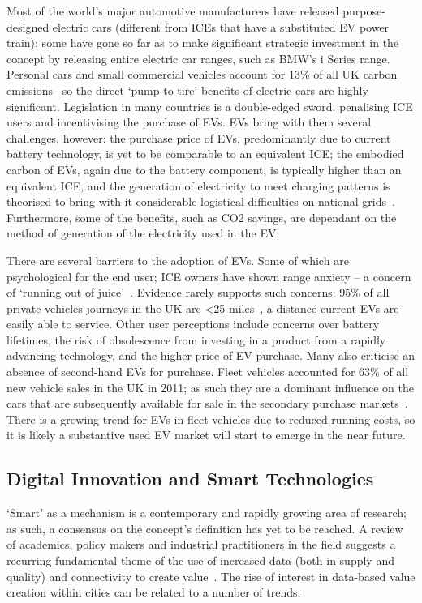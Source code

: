 \documentclass[journal]{IEEEtran}
\begin{document}
Most of the world's major automotive manufacturers have released
purpose-designed electric cars (different from ICEs that have a
substituted EV power train); some have gone so far as to make
significant strategic investment in the concept by releasing entire
electric car ranges, such as BMW's i Series range. Personal cars and
small commercial vehicles account for 13\% of all UK carbon
emissions~\cite{lumsden:2012} so the direct `pump-to-tire' benefits of
electric cars are highly significant. Legislation in many countries is
a double-edged sword: penalising ICE users and incentivising the
purchase of EVs. EVs bring with them several challenges, however: the
purchase price of EVs, predominantly due to current battery
technology, is yet to be comparable to an equivalent ICE; the embodied
carbon of EVs, again due to the battery component, is typically higher
than an equivalent ICE, and the generation of electricity to meet
charging patterns is theorised to bring with it considerable
logistical difficulties on national
grids~\cite{su-et-al:2011,akhavan-rezai-et-al:2015}. Furthermore, some
of the benefits, such as CO2 savings, are dependant on the method of
generation of the electricity used in the EV.

There are several barriers to the adoption of EVs. Some of which are
psychological for the end user; ICE owners have shown range anxiety --
a concern of `running out of
juice'~\cite{oflev:2011,yilmaz+krein:2012}. Evidence rarely supports
such concerns: 95\% of all private vehicles journeys in the UK are <25
miles~\cite{oflev:2011}, a distance current EVs are easily able to
service. Other user perceptions include concerns over battery
lifetimes, the risk of obsolescence from investing in a product from a
rapidly advancing technology, and the higher price of EV purchase.
Many also criticise an absence of second-hand EVs for purchase. Fleet
vehicles accounted for 63\% of all new vehicle sales in the UK in
2011; as such they are a dominant influence on the cars that are
subsequently available for sale in the secondary purchase
markets~\cite{fleets:2012}. There is a growing trend for EVs in fleet
vehicles due to reduced running costs, so it is likely a substantive
used EV market will start to emerge in the near future.


\subsection{Digital Innovation and Smart Technologies}

`Smart' as a mechanism is a contemporary and rapidly growing area of
research; as such, a consensus on the concept's definition has yet to
be reached. A review of academics, policy makers and industrial
practitioners in the field suggests a recurring fundamental theme of
the use of increased data (both in supply and quality) and
connectivity to create
value~\cite{komninos:2002,arup-et-al:2011,harrison+abbottdonnelly:2011,batty-et-al:2012,buscher:2014}. The
rise of interest in data-based value creation within cities can be
related to a number of trends:
\end{document}

